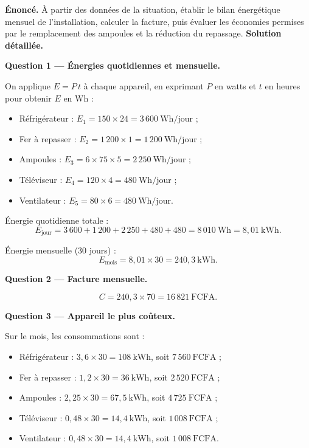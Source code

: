 \documentclass[11pt]{article}
\begin{document}
\begin{exoresolu}
\textbf{Énoncé.} À partir des données de la situation, établir le bilan énergétique mensuel de l'installation, calculer la facture, puis évaluer les économies permises par le remplacement des ampoules et la réduction du repassage.
\tcblower
\textbf{Solution détaillée.}

\textbf{Question 1 — Énergies quotidiennes et mensuelle.}

On applique $E = P\,t$ à chaque appareil, en exprimant $P$ en watts et $t$ en heures pour obtenir $E$ en Wh :

\begin{itemize}
\item Réfrigérateur : $E_1 = 150 \times 24 = 3\,600~\mathrm{Wh/jour}$ ;
\item Fer à repasser : $E_2 = 1\,200 \times 1 = 1\,200~\mathrm{Wh/jour}$ ;
\item Ampoules : $E_3 = 6 \times 75 \times 5 = 2\,250~\mathrm{Wh/jour}$ ;
\item Téléviseur : $E_4 = 120 \times 4 = 480~\mathrm{Wh/jour}$ ;
\item Ventilateur : $E_5 = 80 \times 6 = 480~\mathrm{Wh/jour}$.
\end{itemize}

Énergie quotidienne totale :
\[ E_{\text{jour}} = 3\,600 + 1\,200 + 2\,250 + 480 + 480 = 8\,010~\mathrm{Wh} = 8{,}01~\mathrm{kWh}. \]

Énergie mensuelle (30 jours) :
\[ E_{\text{mois}} = 8{,}01 \times 30 = 240{,}3~\mathrm{kWh}. \]

\textbf{Question 2 — Facture mensuelle.}

\[ C = 240{,}3 \times 70 = 16\,821~\mathrm{FCFA}. \]

\textbf{Question 3 — Appareil le plus coûteux.}

Sur le mois, les consommations sont :
\begin{itemize}
\item Réfrigérateur : $3{,}6 \times 30 = 108~\mathrm{kWh}$, soit $7\,560~\mathrm{FCFA}$ ;
\item Fer à repasser : $1{,}2 \times 30 = 36~\mathrm{kWh}$, soit $2\,520~\mathrm{FCFA}$ ;
\item Ampoules : $2{,}25 \times 30 = 67{,}5~\mathrm{kWh}$, soit $4\,725~\mathrm{FCFA}$ ;
\item Téléviseur : $0{,}48 \times 30 = 14{,}4~\mathrm{kWh}$, soit $1\,008~\mathrm{FCFA}$ ;
\item Ventilateur : $0{,}48 \times 30 = 14{,}4~\mathrm{kWh}$, soit $1\,008~\mathrm{FCFA}$.
\end{itemize}


\end{exoresolu}
\end{document}
